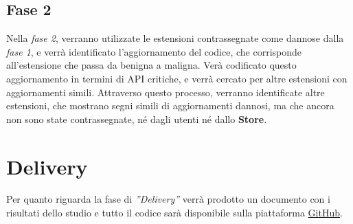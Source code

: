 \documentclass[ 11pt, oneside, italian, onehalfspacing, headsepline, ]{MastersDoctoralThesis}
\begin{document}
{\section{Fase 2}}

Nella \textit{fase 2}, verranno utilizzate le estensioni contrassegnate come dannose dalla \textit{fase 1}, e verrà identificato l'aggiornamento del codice, che corrisponde all'estensione che passa da benigna a maligna. Verà codificato questo aggiornamento  in termini di API critiche, e verrà cercato per altre estensioni con aggiornamenti simili. Attraverso questo processo, verranno identificate altre estensioni, che mostrano segni simili di aggiornamenti dannosi, ma che ancora non sono state contrassegnate, né dagli utenti né dallo \textbf{Store}.

{\chapter{Delivery}}

Per quanto riguarda la fase di \textit{''Delivery''} verrà prodotto un documento con i risultati dello studio e tutto il codice sarà disponibile sulla piattaforma \href{https://github.com/dj-d/FoxWall}{GitHub}.


\printbibliography\
\end{document}
